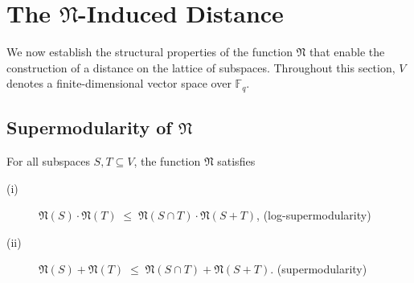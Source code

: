 \documentclass{svproc}
\begin{document}
\section{The $\mathfrak{N}$-Induced Distance}
\label{sec:metric}


We now establish the structural properties of the function $\mathfrak N$
that enable the construction of a distance on the lattice of subspaces.
Throughout this section, $V$ denotes a finite-dimensional vector space
over $\mathbb F_q$.

\subsection{Supermodularity of $\mathfrak N$}

\begin{theorem}\label{thm:supermodular}
For all subspaces $S,T \subseteq V$, the function $\mathfrak N$ satisfies
\begin{description}
     \item[(i)] $\mathfrak N(S) \cdot \mathfrak N(T)
\;\le\;
\mathfrak N(S \cap T) \cdot \mathfrak N(S + T)$, \quad (log-supermodularity)
\item[(ii)] $\mathfrak N(S) + \mathfrak N(T)
\;\le\;
\mathfrak N(S \cap T) + \mathfrak N(S + T).$ \quad (supermodularity)
\end{description}
    

\end{theorem}
\end{document}
